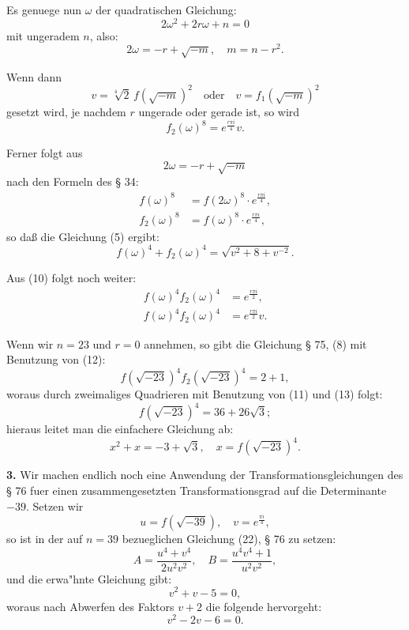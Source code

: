 \documentclass[12pt,a4paper]{article}
\theoremstyle{plain}
\theoremstyle{definition}
\theoremstyle{remark}
\begin{document}
Es genuege nun $\omega$ der quadratischen Gleichung:
\begin{equation}\label{eq:131_6b}
2\omega^2 + 2r\omega + n = 0
\end{equation}
mit ungeradem $n$, also:
\begin{equation}\label{eq:131_7}
2\omega = -r + \sqrt{-m}, \quad m = n - r^2.
\end{equation}

Wenn dann
\begin{equation}\label{eq:131_8}
v = \sqrt[4]{2}\, f(\sqrt{-m})^2 \quad \text{oder} \quad v = f_1(\sqrt{-m})^2
\end{equation}
gesetzt wird, je nachdem $r$ ungerade oder gerade ist, so wird
\begin{equation}\label{eq:131_9b}
f_2(\omega)^8 = e^{\frac{r\pi i}{4}} v.
\end{equation}

Ferner folgt aus
\[
2\omega = -r + \sqrt{-m}
\]
nach den Formeln des \S{} 34:
\begin{align}
f(\omega)^8 &= f(2\omega)^8 \cdot e^{\frac{r\pi i}{4}}, \label{eq:131_10}\\
f_2(\omega)^8 &= f(\omega)^8 \cdot e^{\frac{r\pi i}{4}}, \label{eq:131_11}
\end{align}
so da\ss{} die Gleichung (5) ergibt:
\begin{equation}\label{eq:131_12}
f(\omega)^4 + f_2(\omega)^4 = \sqrt{v^2 + 8 + v^{-2}}.
\end{equation}

Aus (10) folgt noch weiter:
\begin{align}
f(\omega)^4 f_2(\omega)^4 &= e^{\frac{r\pi i}{2}}, \label{eq:131_13}\\
f(\omega)^4 f_2(\omega)^4 &= e^{\frac{r\pi i}{2}} v. \label{eq:131_14}
\end{align}

Wenn wir $n = 23$ und $r = 0$ annehmen, so gibt die Gleichung \S{} 75, (8) mit Benutzung von (12):
\begin{equation}\label{eq:131_15}
f(\sqrt{-23})^4 f_2(\sqrt{-23})^4 = 2 + 1,
\end{equation}
woraus durch zweimaliges Quadrieren mit Benutzung von (11) und (13) folgt:
\[
f(\sqrt{-23})^4 = 36 + 26\sqrt{3};
\]
hieraus leitet man die einfachere Gleichung ab:
\begin{equation}\label{eq:131_16}
x^2 + x = -3 + \sqrt{3}, \quad x = f(\sqrt{-23})^4.
\end{equation}

\textbf{3.} Wir machen endlich noch eine Anwendung der Transformationsgleichungen des \S{} 76 fuer einen zusammengesetzten Transformationsgrad auf die Determinante $-39$. Setzen wir
\[
u = f(\sqrt{-39}), \quad v = e^{\frac{\pi i}{4}},
\]
so ist in der auf $n = 39$ bezueglichen Gleichung (22), \S{} 76 zu setzen:
\[
A = \frac{u^4 + v^4}{2u^2 v^2}, \quad B = \frac{u^4 v^4 + 1}{u^2 v^2},
\]
und die erwa"hnte Gleichung gibt:
\[
v^2 + v - 5 = 0,
\]
woraus nach Abwerfen des Faktors $v + 2$ die folgende hervorgeht:
\[
v^2 - 2v - 6 = 0.
\]
\end{document}

